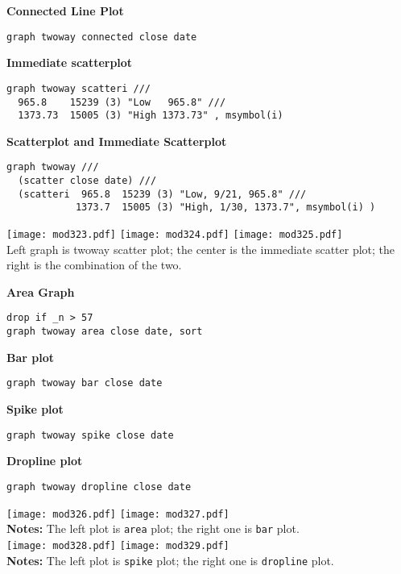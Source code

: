 \textbf{Connected Line Plot}
\begin{lstlisting}
graph twoway connected close date
\end{lstlisting}


\textbf{Immediate scatterplot}
\begin{lstlisting}
graph twoway scatteri ///
  965.8    15239 (3) "Low   965.8" ///
  1373.73  15005 (3) "High 1373.73" , msymbol(i)
\end{lstlisting}

\textbf{Scatterplot and Immediate Scatterplot}
\begin{lstlisting}
graph twoway ///
  (scatter close date) ///
  (scatteri  965.8  15239 (3) "Low, 9/21, 965.8" ///
            1373.7  15005 (3) "High, 1/30, 1373.7", msymbol(i) )
\end{lstlisting}
\begin{center}
\texttt{[image: mod323.pdf]}\hfil
\texttt{[image: mod324.pdf]}\hfil
\texttt{[image: mod325.pdf]}\\
Left graph is twoway scatter plot; the center is the immediate scatter plot; the right is the combination of the two.
\end{center}

\textbf{Area Graph}
\begin{lstlisting}
drop if _n > 57
graph twoway area close date, sort
\end{lstlisting}

\textbf{Bar plot}
\begin{lstlisting}
graph twoway bar close date
\end{lstlisting}

\textbf{Spike plot}
\begin{lstlisting}
graph twoway spike close date
\end{lstlisting}

\textbf{Dropline plot}
\begin{lstlisting}
graph twoway dropline close date
\end{lstlisting}

\begin{center}
\texttt{[image: mod326.pdf]}
\texttt{[image: mod327.pdf]}\\
\textbf{Notes:} The left plot is \lstinline{area} plot; the right one is \lstinline{bar} plot.\\
\texttt{[image: mod328.pdf]}
\texttt{[image: mod329.pdf]}\\
\textbf{Notes:} The left plot is \lstinline{spike} plot; the right one is \lstinline{dropline} plot.\\
\end{center}

